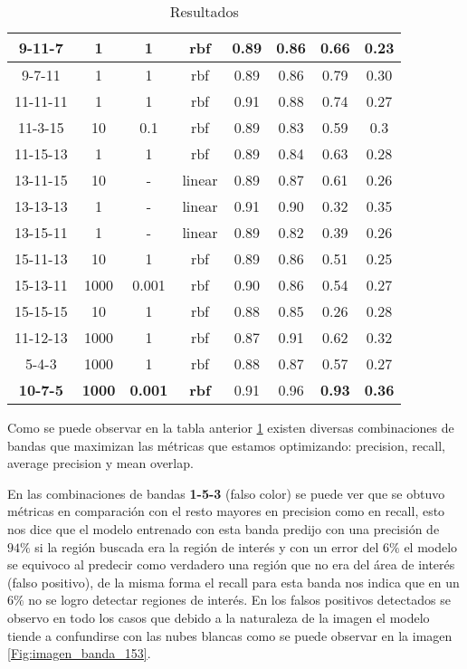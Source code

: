 \begin{table}[H]
\begin{center}
\begin{tabular}{|c|c|c|c|c|c|c|c|}
\multicolumn{1}{|c|}{9-11-7} & 1 & 1 & rbf & 0.89 & 0.86 & 0.66 & 0.23 \\ \hline
\multicolumn{1}{|c|}{9-7-11} & 1 & 1 & rbf & 0.89 & 0.86 & 0.79 & 0.30\\ \hline
\multicolumn{1}{|c|}{11-11-11} & 1 & 1 & rbf & 0.91 & 0.88 & 0.74 & 0.27 \\ \hline
\multicolumn{1}{|c|}{11-3-15} & 10 & 0.1 & rbf & 0.89 & 0.83 & 0.59 & 0.3 \\ \hline
\multicolumn{1}{|c|}{11-15-13} & 1 & 1 & rbf & 0.89 & 0.84 & 0.63 & 0.28 \\ \hline
\multicolumn{1}{|c|}{13-11-15} & 10 & - & linear & 0.89 & 0.87 & 0.61 & 0.26 \\ \hline
\multicolumn{1}{|c|}{13-13-13} & 1 & - & linear & 0.91 & 0.90 & 0.32 & 0.35 \\ \hline
\multicolumn{1}{|c|}{13-15-11} & 1 & - & linear & 0.89 & 0.82 & 0.39 & 0.26 \\ \hline
\multicolumn{1}{|c|}{15-11-13} & 10 & 1 & rbf & 0.89 & 0.86 & 0.51 & 0.25 \\ \hline
\multicolumn{1}{|c|}{15-13-11} & 1000 & 0.001 & rbf & 0.90 & 0.86 & 0.54 & 0.27 \\ \hline
\multicolumn{1}{|c|}{15-15-15} & 10 & 1 & rbf & 0.88 & 0.85 & 0.26 & 0.28 \\ \hline
\multicolumn{1}{|c|}{11-12-13} & 1000 & 1 & rbf & 0.87 & 0.91 & 0.62 & 0.32 \\ \hline
\multicolumn{1}{|c|}{5-4-3} & 1000 & 1 & rbf & 0.88 & 0.87 & 0.57 & 0.27 \\ \hline
\multicolumn{1}{|c|}{\textbf{10-7-5}} & \textbf{1000} &\textbf{ 0.001} & \textbf{rbf} & 0.91 & 0.96 &\cellcolor{blue!25}\textbf{0.93} & \cellcolor{blue!25}\textbf{0.36}\\ \hline
\end{tabular}
\end{center}\caption{Resultados}\label{tab:entrenam-result}
\end{table}

Como se puede observar en la tabla anterior \ref{tab:entrenam-result} existen diversas combinaciones de bandas que maximizan las métricas que estamos optimizando: precision, recall, average precision y mean overlap.  

En las combinaciones de bandas \textbf{1-5-3} (falso color) se puede ver que se obtuvo métricas en comparación con el resto mayores en precision como en recall, esto nos dice que el modelo entrenado con esta banda predijo con una precisión de  $94\%$  si la región buscada era la región de interés y con un error del $6\%$ el modelo se equivoco al predecir como verdadero una región que no era del área de interés (falso positivo), de la misma forma el recall para esta banda nos indica que en un $6\%$ no se logro detectar regiones de interés. En los falsos positivos detectados se observo en todo los casos que debido a la naturaleza de la imagen el modelo tiende a confundirse con las nubes blancas como se puede observar en la imagen \ref{Fig:imagen_banda_153}.

